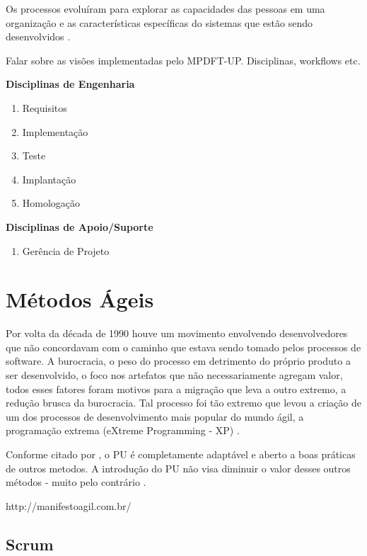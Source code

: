 \documentclass[
	article,			%
	11pt,				%
	oneside,			%
	a4paper,			%
	english,			%
	brazil,				%
	sumario=tradicional
	]{abntex2}
\begin{document}
Os processos evoluíram para explorar as capacidades das pessoas em uma
organização e as características específicas do sistemas que estão sendo
desenvolvidos \cite{sommerville2007}.

Falar sobre as visões implementadas pelo MPDFT-UP. Disciplinas, workflows etc.

\textbf{Disciplinas de Engenharia}

\begin{enumerate}
   \item Requisitos
   \item Implementação
   \item Teste
   \item Implantação
   \item Homologação
\end{enumerate}

\textbf{Disciplinas de Apoio/Suporte}

\begin{enumerate}
   \item Gerência de Projeto
\end{enumerate}

\section{Métodos Ágeis}

Por volta da década de 1990 houve um movimento envolvendo desenvolvedores que
não concordavam com o caminho que estava sendo tomado pelos processos de
software. A burocracia, o peso do processo em detrimento do próprio produto a
ser desenvolvido, o foco nos artefatos que não necessariamente agregam valor,
todos esses fatores foram motivos para a migração que leva a outro extremo, a
redução brusca da burocracia. Tal processo foi tão extremo que levou a criação
de um dos processos de desenvolvimento mais popular do mundo ágil, a programação
extrema (eXtreme Programming - XP) \cite{Beck:1999:ECE:619045.621348}.

Conforme citado por , o PU é completamente
adaptável e aberto a boas práticas de outros metodos. A introdução do PU não
visa diminuir o valor desses outros métodos - muito pelo contrário
\cite{larman2007utilizando}.

http://manifestoagil.com.br/ \cite{agilemanifesto}


\subsection{Scrum}
\end{document}
